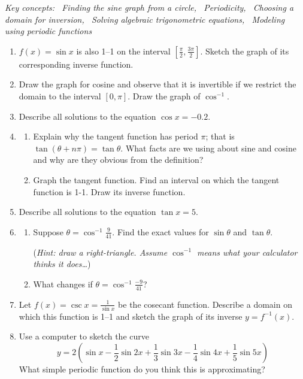 \begin{exercises}
	\hangindent\leftmargini
	\emph{Key concepts: \ Finding the sine graph from a circle, \ Periodicity, \ Choosing a domain for inversion, \ Solving algebraic trigonometric equations, \ Modeling using periodic functions}
	
	\begin{enumerate}
		\item $f(x)=\sin x$ is also 1--1 on the interval $[\frac\pi 2,\frac{3\pi}2]$. Sketch the graph of its corresponding inverse function.
	
	  \item Draw the graph for cosine and observe that it is invertible if we restrict the domain to the interval $[0,\pi]$. Draw the graph of $\cos^{-1}$.
	  
	  \item Describe all solutions to the equation $\cos x=-0.2$.
	  
	  \item\begin{enumerate}
	    \item Explain why the tangent function has period $\pi$; that is $\tan(\theta+n\pi)=\tan \theta$. What facts are we using about sine and cosine and why are they obvious from the definition?
	    \item Graph the tangent function. Find an interval on which the tangent function is 1-1. Draw its inverse function.
	  \end{enumerate}
	  
	  \item Describe all solutions to the equation $\tan x=5$.
	  
	  \item\begin{enumerate}
	    \item Suppose $\theta=\cos^{-1}\frac 9{41}$. Find the exact values for $\sin\theta$ and $\tan\theta$.\par
	    (\emph{Hint: draw a right-triangle. Assume $\cos^{-1}$ means what your calculator thinks it does\ldots})
	    \item What changes if $\theta=\cos^{-1}\frac{-9}{41}$?
	  \end{enumerate} 
	  
	  \item Let $f(x)=\csc x=\frac 1{\sin x}$ be the cosecant function. Describe a domain on which this function is 1--1 and sketch the graph of its inverse $y=f^{-1}(x)$.
	  
	  \item Use a computer to sketch the curve
	  \[
	  	y=2\left(\sin x-\frac 12\sin 2x+\frac 13\sin 3x-\frac 14\sin 4x+\frac 15\sin 5x\right)
	  \]
	  What simple periodic function do you think this is approximating?
	\end{enumerate}
\end{exercises}


